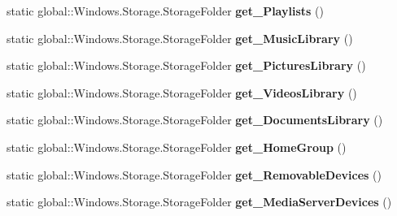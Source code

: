 \begin{DoxyCompactItemize}
\mbox{\label{class_windows_1_1_storage_1_1_known_folders_af660eb2549fc7f22379774000686d890}} 
static global\+::\+Windows.\+Storage.\+Storage\+Folder {\bfseries get\+\_\+\+Playlists} ()
\item 
\mbox{\label{class_windows_1_1_storage_1_1_known_folders_a385778d65001ff5821c5395815254772}} 
static global\+::\+Windows.\+Storage.\+Storage\+Folder {\bfseries get\+\_\+\+Music\+Library} ()
\item 
\mbox{\label{class_windows_1_1_storage_1_1_known_folders_a653b9b1f039c720de8b02e32d4139930}} 
static global\+::\+Windows.\+Storage.\+Storage\+Folder {\bfseries get\+\_\+\+Pictures\+Library} ()
\item 
\mbox{\label{class_windows_1_1_storage_1_1_known_folders_a4e637cb715e9d1600f05e297b1f73be7}} 
static global\+::\+Windows.\+Storage.\+Storage\+Folder {\bfseries get\+\_\+\+Videos\+Library} ()
\item 
\mbox{\label{class_windows_1_1_storage_1_1_known_folders_a46d0afa10b55b07fcbe5b69b12c6a351}} 
static global\+::\+Windows.\+Storage.\+Storage\+Folder {\bfseries get\+\_\+\+Documents\+Library} ()
\item 
\mbox{\label{class_windows_1_1_storage_1_1_known_folders_afaf43060342706d67a7a25a467545948}} 
static global\+::\+Windows.\+Storage.\+Storage\+Folder {\bfseries get\+\_\+\+Home\+Group} ()
\item 
\mbox{\label{class_windows_1_1_storage_1_1_known_folders_a7d4f37e230205c7d410066952eeac000}} 
static global\+::\+Windows.\+Storage.\+Storage\+Folder {\bfseries get\+\_\+\+Removable\+Devices} ()
\item 
\mbox{\label{class_windows_1_1_storage_1_1_known_folders_afd2c3f741c42f2f472afa0f33c0a19c6}} 
static global\+::\+Windows.\+Storage.\+Storage\+Folder {\bfseries get\+\_\+\+Media\+Server\+Devices} ()
\item 

\end{DoxyCompactItemize}
